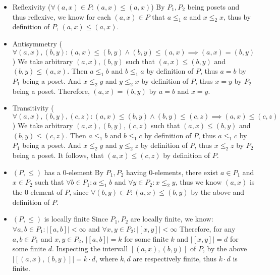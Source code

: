 \documentclass[
]{article}
\providecommand{\tightlist}{%
  \setlength{\itemsep}{0pt}\setlength{\parskip}{0pt}}
\begin{document}
\begin{itemize}
\tightlist
\item
  Reflexivity (\(\forall (a,x) \in P: (a,x) \leq (a,x)\)) By \(P_1,P_2\)
  being posets and thus reflexive, we know for each \((a,x) \in P\) that
  \(a \leq_1 a\) and \(x \leq_2 x\), thus by definition of \(P\),
  \((a,x) \leq (a,x)\).
\item
  Antisymmetry
  (\(\forall (a,x),(b,y): (a,x) \leq (b,y) \land (b,y) \leq (a,x) \implies (a,x) = (b,y)\))
  We take arbitrary \((a,x), (b,y)\) such that \((a,x) \leq (b,y)\) and
  \((b,y) \leq (a,x)\). Then \(a \leq_1 b\) and \(b \leq_1 a\) by
  definition of \(P\), thus \(a = b\) by \(P_1\) being a poset. And
  \(x \leq_2 y\) and \(y \leq_2 x\) by definition of \(P\), thus
  \(x = y\) by \(P_2\) being a poset. Therefore, \((a,x) = (b,y)\) by
  \(a = b\) and \(x = y\).
\item
  Transitivity
  (\(\forall (a,x), (b,y), (c,z): (a,x) \leq (b,y) \land (b,y) \leq (c,z) \implies (a,x) \leq (c,z)\))
  We take arbitrary \((a,x), (b,y), (c,z)\) such that
  \((a,x) \leq (b,y)\) and \((b,y) \leq (c,z)\). Then \(a \leq_1 b\) and
  \(b \leq_1 c\) by definition of \(P\), thus \(a \leq_1 c\) by \(P_1\)
  being a poset. And \(x \leq_2 y\) and \(y \leq_2 z\) by definition of
  \(P\), thus \(x \leq_2 z\) by \(P_2\) being a poset. It follows, that
  \((a,x) \leq (c,z)\) by definition of \(P\).
\item
  \((P,\leq)\) has a \(0\)-element By \(P_1, P_2\) having
  \(0\)-elements, there exist \(a \in P_1\) and \(x \in P_2\) such that
  \(\forall b \in P_1: a \leq_1 b\) and
  \(\forall y \in P_2: x \leq_2 y\), thus we know \((a,x)\) is the
  \(0\)-element of \(P\), since
  \(\forall (b,y) \in P: (a,x) \leq (b,y)\) by the above and definition
  of \(P\).
\item
  \((P,\leq)\) is locally finite Since \(P_1,P_2\) are locally finite,
  we know: \(\forall a,b \in P_1: |[a,b]| < \infty\) and
  \(\forall x,y \in P_2: |[x,y]| < \infty\) Therefore, for any
  \(a,b \in P_1\) and \(x,y \in P_2\), \(|[a,b]| = k\) for some finite
  \(k\) and \(|[x,y]| = d\) for some finite \(d\). Inspecting the
  intervall \([(a,x),(b,y)]\) of \(P\), by the above
  \(|[(a,x),(b,y)]| = k \cdot d\), where \(k,d\) are respectively
  finite, thus \(k \cdot d\) is finite.
\end{itemize}
\end{document}

